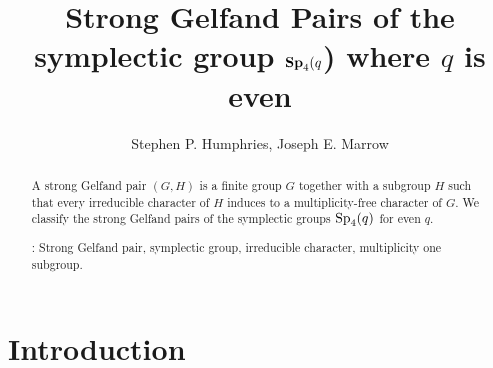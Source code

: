\documentclass{amsart}
\begin{document}
\title{Strong Gelfand Pairs of the symplectic group  $\boldsymbol{\rm Sp}_4(q$) where $q$ is even}


\author{Stephen P.  Humphries, Joseph E. Marrow}
  \address{Department of Mathematics,  Brigham Young University, Provo, 
UT 84602, U.S.A.
E-mail:  steve@mathematics.byu.edu, jemarrow@math.byu.edu}
\date{}
\maketitle

\begin{abstract}  
A strong Gelfand pair $(G,H)$ is a finite group $G$ together with a subgroup $H$ such that every irreducible character of $H$ induces to  a multiplicity-free character of $G$.  We classify the strong Gelfand pairs of the symplectic  groups
${\rm Sp}_4(q)$ for even $q$.


\medskip

: Strong Gelfand pair, symplectic group, irreducible character, multiplicity one subgroup. \newline 
\medskip
{}
\end{abstract}


\theoremstyle{plain}

 
\theoremstyle{definition}
\newtheorem*{dfn}{Definition}
\newtheorem{exa}[thm]{Example}
\newtheorem{rem}[thm]{Remark}

\newcommand{\ds}{\displaystyle}
\newcommand{\bs}{\boldsymbol}
\newcommand{\mb}{\mathbb}
\newcommand{\mc}{\mathcal}
\newcommand{\mf}{\mathfrak}
\renewcommand{\mod}{\operatorname{mod}}
\newcommand{\mult}{\operatorname{Mult}}

\def \a{\alpha} \def \b{\beta} \def \d{\delta} \def \e{\varepsilon} \def \g{\gamma} \def \k{\kappa} \def \l{\lambda} \def \s{\sigma} \def \t{\theta} \def \z{\zeta}


\setlength{\leftmargini}{1.em} \setlength{\leftmarginii}{1.em}
\renewcommand{\labelenumi}{\setlength{\labelwidth}{\leftmargin}
   \addtolength{\labelwidth}{-\labelsep}
   \hbox to \labelwidth{\theenumi.\hfill}}

\maketitle

\section{Introduction}
\end{document}
